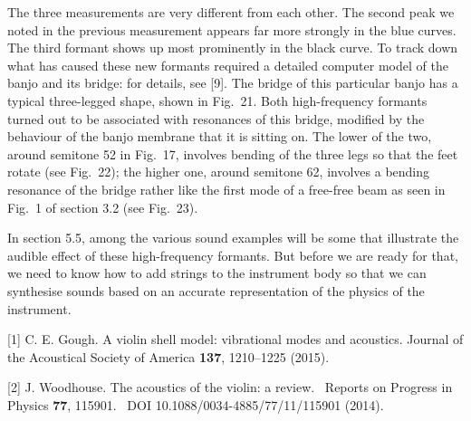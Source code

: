   The three measurements are very different from each other. The second peak we 
  noted in the previous measurement appears far more strongly in the blue 
  curves. The third formant shows up most prominently in the black curve. To 
  track down what has caused these new formants required a detailed computer 
  model of the banjo and its bridge: for details, see [9]. The bridge of this 
  particular banjo has a typical three-legged shape, shown in Fig.\ 21. Both 
  high-frequency formants turned out to be associated with resonances of this 
  bridge, modified by the behaviour of the banjo membrane that it is sitting 
  on. The lower of the two, around semitone 52 in Fig.\ 17, involves bending of 
  the three legs so that the feet rotate (see Fig.\ 22); the higher one, around 
  semitone 62, involves a bending resonance of the bridge rather like the first 
  mode of a free-free beam as seen in Fig.\ 1 of section 3.2 (see Fig.\ 23). 




  In section 5.5, among the various sound examples will be some that illustrate 
  the audible effect of these high-frequency formants. But before we are ready 
  for that, we need to know how to add strings to the instrument body so that 
  we can synthesise sounds based on an accurate representation of the physics 
  of the instrument. 



  \sectionreferences{}[1] C. E. Gough. A violin shell model: vibrational modes 
  and acoustics. Journal of the Acoustical Society of America \textbf{137}, 
  1210–1225 (2015). 

  [2] J. Woodhouse. The acoustics of the violin: a review.~ Reports on Progress 
  in Physics \textbf{77}, 115901.~ DOI 10.1088/0034-4885/77/11/115901 (2014). 

